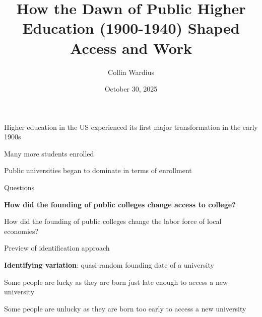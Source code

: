 \documentclass[notes,11pt, aspectratio=169]{beamer}
\title[]{How the Dawn of Public Higher Education (1900-1940) Shaped Access and Work}
\author{Collin Wardius} %
\institute{
  Department of Economics, UC San Diego
  \newline
  Approved by
}
\date[]{October 30, 2025}
\newenvironment{wideitemize}{\itemize\addtolength{\itemsep}{10pt}}{\enditemize}
\begin{document}
\begin{frame}
  \titlepage
\end{frame}

\begin{frame}{Higher education in the US experienced its first major transformation in the early 1900s}
  \begin{wideitemize}
    \item Many more students enrolled
    \item Public universities began to dominate in terms of enrollment
  \end{wideitemize}
\end{frame}


\begin{frame}{Questions}
\begin{wideitemize}
    \item \textbf{How did the founding of public colleges change access to college?}
    \item How did the founding of public colleges change the labor force of local economies?
\end{wideitemize}
\end{frame}

\begin{frame}{Preview of identification approach}
  \begin{wideitemize}
    \item \textbf{Identifying variation}: quasi-random founding date of a university
    \item Some people are lucky as they are born just late enough to access a new university
    \item Some people are unlucky as they are born too early to access a new university
  \end{wideitemize}
\end{frame}
\end{document}
